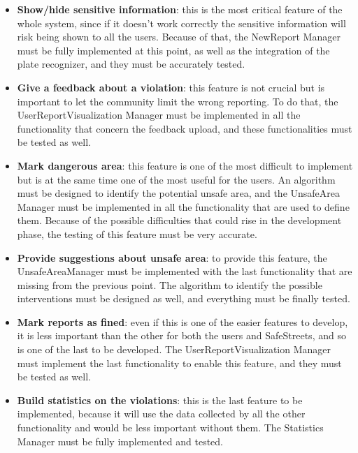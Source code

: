 \documentclass[../RASD.tex]{subfiles}
\begin{document}
\begin{itemize}
        \item \textbf{Show/hide sensitive information}: this is the most critical feature of the whole system, since if it doesn’t work correctly the sensitive information will risk being shown to all the users. Because of that, the NewReport Manager must be fully implemented at this point, as well as the integration of the plate recognizer, and they must be accurately tested.

        \item \textbf{Give a feedback about a violation}: this feature is not crucial but is important to let the community limit the wrong reporting. To do that, the UserReportVisualization Manager must be implemented in all the functionality that concern the feedback upload, and these functionalities must be tested as well.

        \item \textbf{Mark dangerous area}: this feature is one of the most difficult to implement but is at the same time one of the most useful for the users. An algorithm must be designed to identify the potential unsafe area, and the UnsafeArea Manager must be implemented in all the functionality that are used to define them. Because of the possible difficulties that could rise in the development phase, the testing of this feature must be very accurate.

        \item \textbf{Provide suggestions about unsafe area}: to provide this feature, the UnsafeAreaManager must be implemented with the last functionality that are missing from the previous point. The algorithm to identify the possible interventions must be designed as well, and everything must be finally tested.

        \item \textbf{Mark reports as fined}: even if this is one of the easier features to develop, it is less important than the other for both the users and SafeStreets, and so is one of the last to be developed. The UserReportVisualization Manager must implement the last functionality to enable this feature, and they must be tested as well.

        \item \textbf{Build statistics on the violations}: this is the last feature to be implemented, because it will use the data collected by all the other functionality and would be less important without them. The Statistics Manager must be fully implemented and tested.
    \end{itemize}
\end{document}
